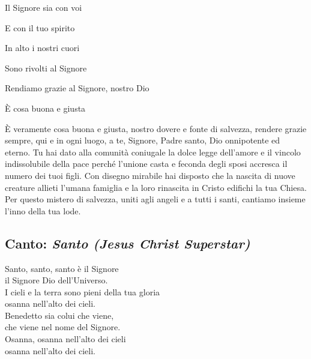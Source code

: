 	\begin{dialoghi}
		\item[\sacerdote] Il Signore sia con voi
		\item[\assemblea] E con il tuo spirito
		\item[\sacerdote] In alto i nostri cuori
		\item[\assemblea] Sono rivolti al Signore
		\item[\sacerdote] Rendiamo grazie al Signore, nostro Dio
		\item[\assemblea] È cosa buona e giusta
		\item[\sacerdote] È veramente cosa buona e giusta, nostro dovere e fonte di salvezza, rendere grazie sempre, qui e in ogni luogo, a te, Signore, Padre santo, Dio onnipotente ed eterno. Tu hai dato alla comunità coniugale la dolce legge dell'amore e il vincolo indissolubile della pace perché l'unione casta e feconda degli sposi accresca il numero dei tuoi figli. Con disegno mirabile hai disposto che la nascita di nuove creature allieti l'umana famiglia e la loro rinascita in Cristo edifichi la tua Chiesa. Per questo mistero di salvezza, uniti agli angeli e a tutti i santi, cantiamo insieme l'inno della tua lode.
	\end{dialoghi}

\subsection*{Canto: \textit{Santo (Jesus Christ Superstar)}}

	\begin{mystrofe}
		Santo, santo, santo è il Signore \\
		il Signore Dio dell'Universo. \\
		I cieli e la terra sono pieni della tua gloria \\
		osanna nell'alto dei cieli. \\
		Benedetto sia colui che viene, \\
		che viene nel nome del Signore. \\
		Osanna, osanna nell'alto dei cieli \\
		osanna nell'alto dei cieli.
	\end{mystrofe}

